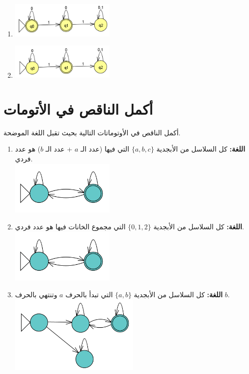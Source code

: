 \documentclass[12pt]{article}
\begin{document}
\begin{enumerate}
\item
\includegraphics[width=0.4\textwidth]{../../../images/DFAs/ex1_q12.png}

\item
\includegraphics[width=0.4\textwidth]{../../../images/DFAs/ex1_q13.png}

\end{enumerate}

\clearpage
\section{أكمل الناقص في الأتومات}
أكمل الناقص في الأوتوماتات التالية بحيث تقبل اللغة الموضحة.

\begin{enumerate}

\item
\textbf{اللغة:} كل السلاسل من الأبجدية $\{a, b, c\}$ التي فيها (عدد الـ $a$ + عدد الـ $b$) هو عدد فردي. \\
\includegraphics[width=0.4\textwidth]{../../../images/DFAs/ex1_p2_q1.png}

\item
\textbf{اللغة:} كل السلاسل من الأبجدية $\{0, 1, 2\}$ التي مجموع الخانات فيها هو عدد فردي. \\
\includegraphics[width=0.4\textwidth]{../../../images/DFAs/ex1_p2_q1.png}

\item
\textbf{اللغة:} كل السلاسل من الأبجدية $\{a, b\}$ التي تبدأ بالحرف $a$ وتنتهي بالحرف $b$. \\
\includegraphics[width=0.5\textwidth]{../../../images/DFAs/ex1_p2_q3.png}


\end{enumerate}
\end{document}
